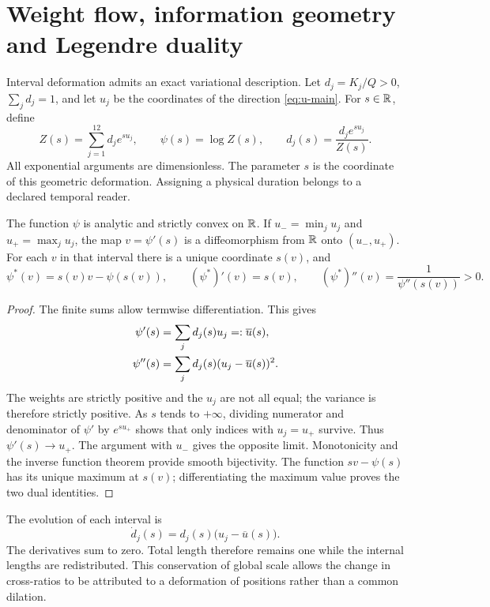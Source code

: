 \section{Weight flow, information geometry and Legendre duality}
\label{sec:convex-refinement}

Interval deformation admits an exact variational
description. Let \(d_j=K_j/Q>0\), \(\sum_jd_j=1\), and let \(u_j\) be the
coordinates of the direction \eqref{eq:u-main}. For \(s\in\mathbb R\),
define
\begin{equation}
 Z(s)=\sum_{j=1}^{12}d_j e^{su_j},\qquad
 \psi(s)=\log Z(s),\qquad
 d_j(s)=\frac{d_j e^{su_j}}{Z(s)}.
 \label{eq:convex-partition}
\end{equation}
All exponential arguments are dimensionless. The parameter
\(s\) is the coordinate of this geometric deformation. Assigning
a physical duration belongs to a declared temporal reader.

\begin{theorem}
The function \(\psi\) is analytic and strictly convex on \(\mathbb R\).
If \(u_- =\min_j u_j\) and \(u_+=\max_j u_j\), the map
\(v=\psi'(s)\) is a diffeomorphism from \(\mathbb R\) onto \((u_-,u_+)\).
For each \(v\) in that interval there is a unique coordinate \(s(v)\), and
\[
 \psi^*(v)=s(v)v-\psi(s(v)),\qquad
 (\psi^*)'(v)=s(v),\qquad
 (\psi^*)''(v)=\frac1{\psi''(s(v))}>0.
\]
\end{theorem}
\begin{proof}
The finite sums allow termwise differentiation. This gives
\begin{align}
 \psi'(s)&=\sum_jd_j(s)u_j=:\overline u(s),\notag\\
 \psi''(s)&=\sum_jd_j(s)(u_j-\overline u(s))^2.
 \label{eq:variance}
\end{align}
The weights are strictly positive and the \(u_j\) are not all equal;
the variance is therefore strictly positive. As \(s\) tends to
\(+\infty\), dividing numerator and denominator of \(\psi'\) by
\(e^{su_+}\) shows that only indices with \(u_j=u_+\) survive.
Thus \(\psi'(s)\to u_+\). The argument with \(u_-\) gives the opposite
limit. Monotonicity and the inverse function theorem provide
smooth bijectivity. The function \(sv-\psi(s)\) has its unique maximum
at \(s(v)\); differentiating the maximum value proves the two dual
identities.
\end{proof}

The evolution of each interval is
\begin{equation}
 \dot d_j(s)=d_j(s)\bigl(u_j-\overline u(s)\bigr).
 \label{eq:replicator}
\end{equation}
The derivatives sum to zero. Total length therefore remains
one while the internal lengths are redistributed. This conservation
of global scale allows the change in cross-ratios to be attributed to a
deformation of positions rather than a common dilation.

